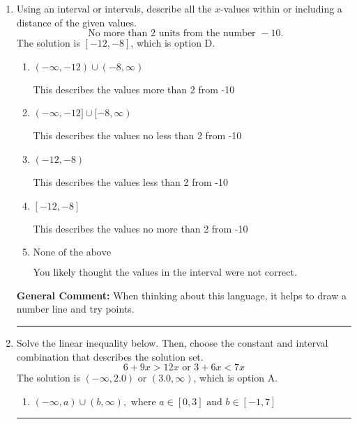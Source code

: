 \documentclass{extbook}[14pt]
\newcommand{\litem}[1]{\item #1

\rule{\textwidth}{0.4pt}}
\begin{document}
\begin{enumerate}
{\begin{enumerate}[label=\Alph*.]
 $(-\infty, -2.039)$, which corresponds to negating the endpoint of the solution.
\item \( (-\infty, a), \text{ where } a \in [1.04, 3.04] \)

* $(-\infty, 2.039)$, which is the correct option.
\item \( \text{None of the above}. \)

You may have chosen this if you thought the inequality did not match the ends of the intervals.
\end{enumerate}

\textbf{General Comment:} Remember that less/greater than or equal to includes the endpoint, while less/greater do not. Also, remember that you need to flip the inequality when you multiply or divide by a negative.
}
\litem{
Using an interval or intervals, describe all the $x$-values within or including a distance of the given values.
\[ \text{ No more than } 2 \text{ units from the number } -10. \]
The solution is \( [-12, -8] \), which is option D.\begin{enumerate}[label=\Alph*.]
\item \( (-\infty, -12) \cup (-8, \infty) \)

This describes the values more than 2 from -10
\item \( (-\infty, -12] \cup [-8, \infty) \)

This describes the values no less than 2 from -10
\item \( (-12, -8) \)

This describes the values less than 2 from -10
\item \( [-12, -8] \)

This describes the values no more than 2 from -10
\item \( \text{None of the above} \)

You likely thought the values in the interval were not correct.
\end{enumerate}

\textbf{General Comment:} When thinking about this language, it helps to draw a number line and try points.
}
\litem{
Solve the linear inequality below. Then, choose the constant and interval combination that describes the solution set.
\[ 6 + 9 x > 12 x \text{ or } 3 + 6 x < 7 x \]
The solution is \( (-\infty, 2.0) \text{ or } (3.0, \infty) \), which is option A.\begin{enumerate}[label=\Alph*.]
\item \( (-\infty, a) \cup (b, \infty), \text{ where } a \in [0, 3] \text{ and } b \in [-1, 7] \)


\end{enumerate}}
\end{enumerate}
\end{document}

